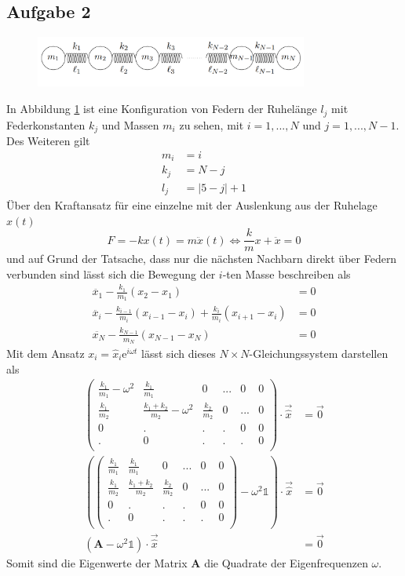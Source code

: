 \subsection*{Aufgabe 2}

\begin{figure}[h!]
\centering
\includegraphics[width=0.8\textwidth]{content/images/Federn.png}
\label{fig:federn}
\end{figure}

\noindent In Abbildung \ref{fig:federn} ist eine Konfiguration von Federn der Ruhelänge $l_j$ mit Federkonstanten $k_j$ und Massen $m_i$ zu sehen, mit $i=1,...,N$ und $j = 1,...,N-1$. Des Weiteren gilt
\begin{align*}
m_i &= i\\
k_j &= N - j\\
l_j &= |5 - j| + 1
\end{align*}
Über den Kraftansatz für eine einzelne mit der Auslenkung aus der Ruhelage $x(t)$
\[
F = -kx(t) = m \ddot{x}(t) \Leftrightarrow {\frac{k}{m}}x + \ddot{x} = 0
\]
und auf Grund der Tatsache, dass nur die nächsten Nachbarn direkt über Federn verbunden sind lässt sich die Bewegung der $i$-ten Masse beschreiben als
\begin{align*}
\ddot{x_1} - \frac{k_1}{m_1}(x_2-x_1) &= 0\\
\ddot{x_i} - \frac{k_{i-1}}{m_i}(x_{i-1}-x_i)+\frac{k_i}{m_i}(x_{i+1}-x_i) &= 0\\
\ddot{x_N} - \frac{k_{N-1}}{m_N}(x_{N-1}-x_N) &= 0
\end{align*}
Mit dem Ansatz $x_i = \hat{x}_i\mathrm{e}^{i\omega t}$ lässt sich dieses $N\times N$-Gleichungssystem darstellen als
\begin{align*}
\begin{pmatrix}
\frac{k_1}{m_1}-\omega^2 & \frac{k_1}{m_1} & 0 & ... & 0 & 0\\
\frac{k_1}{m_2} & \frac{k_1+k_2}{m_2}- \omega^2 & \frac{k_2}{m_2} & 0 & ... & 0\\
0 & . & . & . & 0 & 0\\
. & 0 & . & . & . & 0\\
\end{pmatrix}\cdot\vec{\hat{x}} &= \vec{0}\\
\left(\begin{pmatrix}
\frac{k_1}{m_1} & \frac{k_1}{m_1} & 0 & ... & 0 & 0\\
\frac{k_1}{m_2} & \frac{k_1+k_2}{m_2} & \frac{k_2}{m_2} & 0 & ... & 0\\
0 & . & . & . & 0 & 0\\
. & 0 & . & . & . & 0\\
\end{pmatrix} - \omega^2\mathds{1}\right) \cdot\vec{\hat{x}} &= \vec{0}\\
\left(\mathbf{A}- \omega^2\mathds{1}\right) \cdot\vec{\hat{x}} &= \vec{0}
\end{align*}
Somit sind die Eigenwerte der Matrix $\mathbf{A}$ die Quadrate der Eigenfrequenzen $\omega$.

